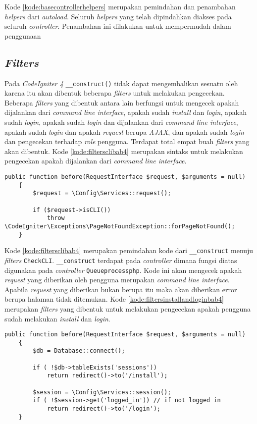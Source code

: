 Kode \ref{kode:basecontrollerhelpers} merupakan pemindahan dan penambahan \textit{helpers} dari \textit{autoload}. Seluruh \textit{helpers} yang telah dipindahkan diakses pada seluruh \textit{controller}. Penambahan ini dilakukan untuk mempermudah dalam penggunaan 

\subsection{\textit{Filters}}
Pada \textit{CodeIgniter 4} \texttt{\_\_construct()} tidak dapat mengembalikan sesuatu oleh karena itu akan dibentuk beberapa \textit{filters} untuk melakukan pengecekan. Beberapa \textit{filters} yang dibentuk antara lain berfungsi untuk mengecek apakah dijalankan dari \textit{command line interface}, apakah sudah \textit{install} dan \textit{login}, apakah sudah \textit{login}, apakah sudah \textit{login} dan dijalankan dari \textit{command line interface}, apakah sudah \textit{login} dan apakah \textit{request} berupa \textit{AJAX}, dan apakah sudah \textit{login} dan pengecekan terhadap \textit{role} pengguna. Terdapat total empat buah \textit{filters} yang akan dibentuk. Kode \ref{kode:filtersclibab4} merupakan sintaks untuk melakukan pengecekan apakah dijalankan dari \textit{command line interface}.

\begin{lstlisting}[caption=Pemindahan kode pada \textit{Filters} \texttt{CheckCLI.php}, label=kode:filtersclibab4]
	public function before(RequestInterface $request, $arguments = null)
    {   
        $request = \Config\Services::request();

        if ($request->isCLI())
            throw \CodeIgniter\Exceptions\PageNotFoundException::forPageNotFound();
    }
\end{lstlisting}
Kode \ref{kode:filtersclibab4} merupakan pemindahan kode dari \texttt{\_\_construct} menuju \textit{filters} \texttt{CheckCLI}.  \texttt{\_\_construct} terdapat pada \textit{controller} dimana fungsi diatas digunakan pada \textit{controller} \texttt{Queueprocessphp}. Kode ini akan mengecek apakah \textit{request} yang diberikan oleh pengguna merupakan \textit{command line interface}. Apabila \textit{request} yang diberikan bukan berupa itu maka akan diberikan error berupa halaman tidak ditemukan. Kode \ref{kode:filtersinstallandloginbab4} merupakan \textit{filters} yang dibentuk untuk melakukan pengecekan apakah pengguna sudah melakukan \textit{install} dan \textit{login}.

\begin{lstlisting}[caption=Pemindahan kode pada \textit{Filters}, label=kode:filtersinstallandloginbab4]
	public function before(RequestInterface $request, $arguments = null)
    {   
        $db = Database::connect();

        if ( !$db->tableExists('sessions'))
			return redirect()->to('/install');
        
        $session = \Config\Services::session();
		if ( !$session->get('logged_in')) // if not logged in
			return redirect()->to('/login');
    }
\end{lstlisting}

